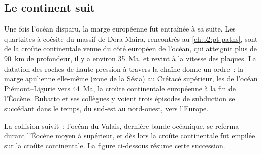 \subsection*{Le continent suit}

Une fois l'océan disparu, la marge européenne fut entraînée à sa suite. Les quartzites à coésite du massif
de Dora Maira, rencontrés au \cref{ch:b2:pt-paths}, sont de la croûte continentale venue du côté européen de l'océan,
qui atteignit plus de \qty{90}{km} de profondeur, il y a environ
\qty{35}{Ma}, et revint à la vitesse des plaques. La datation des roches de haute
pression à travers la chaîne donne un ordre~: la marge apulienne elle-même (zone de la Sésia) au
Crétacé supérieur, les  de l'océan Piémont--Ligurie vers \qty{44}{Ma}, la
croûte continentale européenne à la fin de l'Éocène. Rubatto et ses collègues y voient trois épisodes de subduction se succédant dans le temps, du
sud-est au nord-ouest, vers l'Europe.

La collision suivit~: l'océan du Valais, dernière bande océanique, se referma durant l'Éocène moyen à
supérieur, et dès lors la croûte continentale fut empilée sur la croûte continentale.
La figure ci-dessous résume cette succession.


